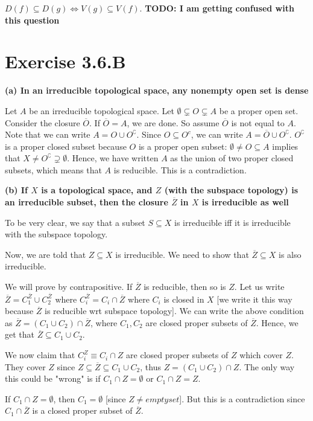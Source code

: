 \documentclass{book}
\renewcommand{\c}{\complement} %
\theoremstyle{definition}
\begin{document}
$D(f) \subseteq D(g) \iff V(g) \subseteq V(f)$.
\textbf{TODO: I am getting confused with this question}

\section{Exercise 3.6.B}
\textbf{(a) In an irreducible topological space, any nonempty open set is dense}


Let $A$ be an irreducible topological space. Let $\emptyset \subsetneq O \subsetneq A$
be a proper open set.
Consider the closure $\overline{O}$. If $\overline{O} = A$, we are done.
So assume $\overline{O}$ is not equal to $A$.
Note that we can write $A = O \cup O^\c$. Since $O \subseteq O^c$, we can write
$A = \overline{O} \cup O^\c$. $O^\c$ is a proper closed subset because $O$ is
a proper open subset: $\emptyset \neq O \subseteq A$ implies that  $X \neq O^\c \supsetneq \emptyset$.
Hence, we have written $A$ as the union of two proper closed subsets, which means
that $A$ is reducible. This is a contradiction.

\textbf{(b) If $X$ is a topological space, and $Z$ (with the subspace topology) is an irreducible
subset, then the closure $\overline{Z}$ in $X$ is irreducible as well}

To be very clear, we say that a subset $S \subseteq X$ is irreducible iff
it is irreducible with the subspace topology.


Now, we are told that $Z \subseteq X$ is irreducible. We need to show
that $\overline{Z} \subseteq X$ is also irreducible. 

We will prove by contrapositive. If $\overline{Z}$ is reducible, then
so is $Z$. Let us write $\overline{Z} = C_1^{\overline Z} \cup C_2^{\overline Z}$
where $C_i^{\overline Z} = C_i \cap \overline Z$ where $C_i$ is closed in $X$
[we write it this way because $\overline{Z}$ is reducible wrt subspace topology].
We can write the above condition as $\overline{Z} = (C_1 \cup C_2) \cap \overline{Z}$,
where $C_1, C_2$ are closed proper subsets of $\overline{Z}$. Hence, we
get that $\overline{Z} \subseteq C_1 \cup C_2$.

We now claim that $C_i^Z \equiv C_i \cap Z$ are closed proper subsets of $Z$
which cover $Z$.  They cover $Z$ since  $Z \subseteq \overline Z \subseteq C_1 \cup C_2$,
thus $Z = (C_1 \cup C_2) \cap Z$. The only way this could be "wrong" is if
$C_1 \cap Z = \emptyset $ or $C_1 \cap Z = Z$. 

If $C_1 \cap Z = \emptyset$, then
$C_1 = \emptyset$ [since $Z \neq emptyset$]. But this is a contradiction since $C_1 \cap \overline{Z}$
is a closed proper subset of $\overline{Z}$.
\end{document}
